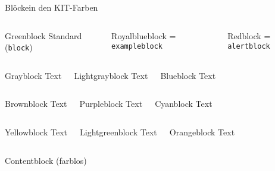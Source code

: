 \documentclass{sdqbeamer}
\begin{document}
\begin{frame}{Blöcke}{in den KIT-Farben}
	\begin{columns}
		\column{\kittwocolumns}
		\begin{greenblock}{Greenblock}
			Standard (\texttt{block})
        \end{greenblock}
		\column{\kittwocolumns}
		\begin{royalblueblock}{Royalblueblock}
			= \texttt{exampleblock}
        \end{royalblueblock}
		\column{\kittwocolumns}
		\begin{redblock}{Redblock}
			= \texttt{alertblock}
        \end{redblock}
	\end{columns}
	\begin{columns}
		\column{\kittwocolumns}
		\begin{grayblock}{Grayblock}
			Text
        \end{grayblock}
		\column{\kittwocolumns}
		\begin{lightgrayblock}{Lightgrayblock}
			Text
        \end{lightgrayblock}
		\column{\kittwocolumns}
		\begin{blueblock}{Blueblock}
			Text
        \end{blueblock}
	\end{columns}
	\begin{columns}
		\column{\kittwocolumns}
        \begin{brownblock}{Brownblock}
			Text
        \end{brownblock}
		\column{\kittwocolumns}
        \begin{purpleblock}{Purpleblock}
			Text
        \end{purpleblock}
		\column{\kittwocolumns}
        \begin{cyanblock}{Cyanblock}
			Text
        \end{cyanblock}
	\end{columns}
	\begin{columns}
		\column{\kittwocolumns}
        \begin{yellowblock}{Yellowblock}
			Text
        \end{yellowblock}
		\column{\kittwocolumns}
        \begin{lightgreenblock}{Lightgreenblock}
			Text
        \end{lightgreenblock}
		\column{\kittwocolumns}
        \begin{orangeblock}{Orangeblock}
			Text
        \end{orangeblock}
	\end{columns}
	\begin{columns}
		\column{\kittwocolumns}
		\begin{contentblock}{Contentblock}
			(farblos)
		\end{contentblock}
		\column{\kittwocolumns}
		\column{\kittwocolumns}
	\end{columns}
\end{frame}
	  
\end{document}

